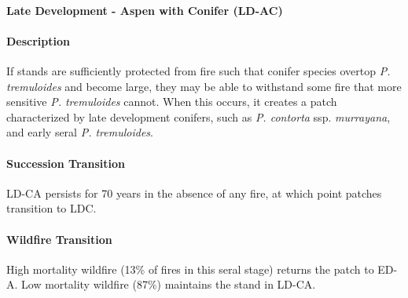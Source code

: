 \noindent\hrulefill


\paragraph*{Late Development - Aspen with Conifer (LD-AC)}

\paragraph*{Description} If stands are sufficiently protected from fire such that conifer species overtop \emph{P. tremuloides} and become large, they may be able to withstand some fire that more sensitive \emph{P. tremuloides} cannot. When this occurs, it creates a patch characterized by late development conifers, such as \emph{P. contorta} ssp. \emph{murrayana}, and early seral \emph{P. tremuloides}. 

\paragraph*{Succession Transition} LD-CA persists for 70 years in the absence of any fire, at which point patches transition to LDC. 

\paragraph*{Wildfire Transition} High mortality wildfire (13\% of fires in this seral stage) returns the patch to ED-A. Low mortality wildfire (87\%) maintains the stand in LD-CA. 

\noindent\hrulefill




